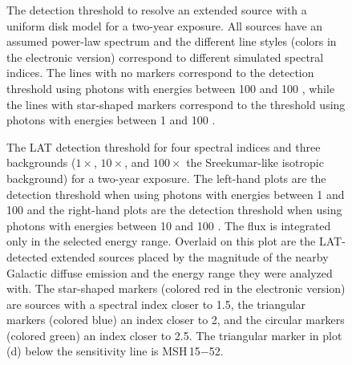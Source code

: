 \documentclass[12pt,preprint]{aastex}
\newif\ifcolorfigure
\newcommand{\mev}{\text{MeV}\xspace}
\newcommand{\gev}{\text{GeV}\xspace}
\begin{document}
\clearpage
\begin{figure}
    \ifcolorfigure
    \plotone{mc_plots/index_sensitivity_color.eps}
    \else
    \fi
    \caption{
    The detection threshold to resolve an
    extended source with a uniform disk model for a two-year exposure.  All sources have an
    assumed power-law spectrum and the different line styles (colors in
    the electronic version) correspond to different simulated spectral
    indices.  The lines with no markers correspond to the detection
    threshold using photons with energies between 100 \mev and 100 \gev,
    while the lines with star-shaped markers correspond to the threshold
    using photons with energies between 1 \gev and 100 \gev.
    }\label{index_sensitivity}
  \end{figure}

\clearpage
\begin{figure}
    \ifcolorfigure
    \plotone{mc_plots/all_sensitivity_color.eps}
    \else
    \fi
    \caption{The LAT detection threshold for four spectral indices
    and three backgrounds ($1\times$, $10\times$, and $100\times$ the
    Sreekumar-like isotropic background) for a two-year exposure. The
    left-hand plots are the detection threshold when using 
    photons with energies between
    1 \gev and 100 \gev
    and the right-hand plots are the detection threshold when using
    photons with energies between
    10 \gev and 100 \gev.  The flux is integrated only in the
    selected energy range.  Overlaid on this plot are the LAT-detected
    extended sources placed by the magnitude of the nearby Galactic
    diffuse emission and the energy range they were analyzed with.
    The star-shaped markers (colored red in the electronic version)
    are sources with a spectral index closer to 1.5, the triangular
    markers (colored blue) an index closer to 2, and the circular markers
    (colored green) an index closer to 2.5.  The triangular marker in plot
    (d) below the sensitivity line is MSH\,15$-$52.
    }\label{all_sensitivity} 
  \end{figure}
\end{document}
